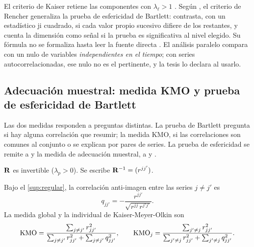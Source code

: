 El criterio de Kaiser retiene las componentes con $\lambda_\ell>1$
\parencite{kaiser_1960}. Según \textcite{camiz_pillar_2018}, el criterio de Rencher generaliza la prueba de
esfericidad de Bartlett: contrasta, con un estadístico ji cuadrado, si cada valor propio sucesivo
difiere de los restantes, y cuenta la dimensión como señal si la prueba es significativa al nivel
elegido. Su fórmula no se formaliza hasta leer la fuente directa
\parencite{rencher_christensen_2012}. El
análisis paralelo compara con un nulo
de variables \emph{independientes en el tiempo}; con series autocorrelacionadas, ese nulo no es el
pertinente, y la tesis lo declara al usarlo.

\subsection{Adecuación muestral: medida KMO y prueba de esfericidad de Bartlett}
\label{sec:adecuacion}

Las dos medidas responden a preguntas distintas. La prueba de Bartlett pregunta si hay alguna
correlación que resumir; la medida KMO, si las correlaciones son comunes al conjunto o se explican
por pares de series. La prueba de esfericidad se remite a
\textcite{bartlett_1950,bartlett_1951} y la medida de adecuación muestral, a
\textcite{kaiser_1970} y \textcite{kaiser_rice_1974}.

\begin{supuesto}\label{sup:regular}
$\mathbf{R}$ es invertible ($\lambda_p>0$). Se escribe $\mathbf{R}^{-1}=(r^{jj'})$.
\end{supuesto}

\begin{definicion}\label{def:kmo}
Bajo el \cref{sup:regular}, la correlación anti-imagen entre las series $j\ne j'$ es
\[
  q_{jj'}=-\frac{r^{jj'}}{\sqrt{r^{jj}\,r^{j'j'}}} .
\]
La medida global y la individual de Kaiser-Meyer-Olkin son
\begin{equation}\label{eq:kmo}
  \operatorname{KMO}=\frac{\sum_{j\ne j'}r_{jj'}^2}{\sum_{j\ne j'}r_{jj'}^2+\sum_{j\ne j'}q_{jj'}^2},
  \qquad
  \operatorname{KMO}_j=\frac{\sum_{j'\ne j}r_{jj'}^2}{\sum_{j'\ne j}r_{jj'}^2+\sum_{j'\ne j}q_{jj'}^2}.
\end{equation}
\end{definicion}

